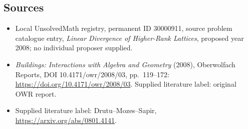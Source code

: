 \documentclass[11pt]{article}
\begin{document}
\subsection{Sources}
\begin{itemize}\item Local UnsolvedMath registry, permanent ID 30000911, source problem catalogue entry, \emph{Linear Divergence of Higher-Rank Lattices}, proposed year 2008; no individual proposer supplied.\item \emph{Buildings: Interactions with Algebra and Geometry} (2008), Oberwolfach Reports, DOI 10.4171/owr/2008/03, pp.\ 119--172: \url{https://doi.org/10.4171/owr/2008/03}. Supplied literature label: original OWR report.\item Supplied literature label: Drutu--Mozes--Sapir, \url{https://arxiv.org/abs/0801.4141}.\end{itemize}
\end{document}
